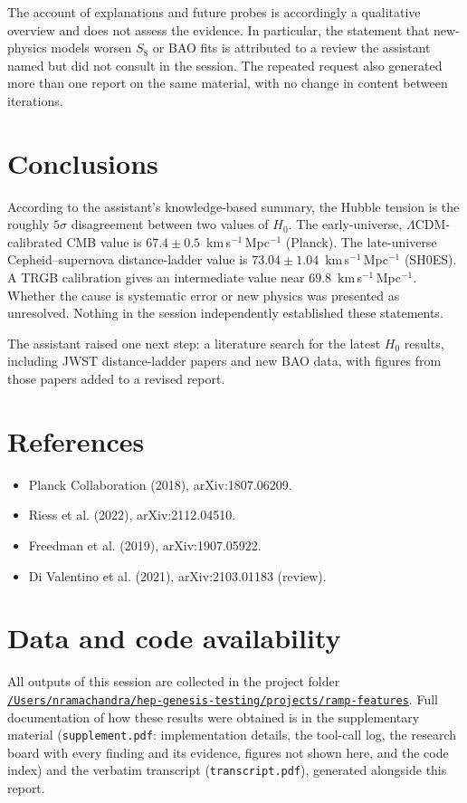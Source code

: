 \documentclass[11pt,a4paper]{article}
\begin{document}
The account of explanations and future probes is accordingly a qualitative overview and does not assess the evidence. In particular, the statement that new-physics models worsen $S_8$ or BAO fits is attributed to a review the assistant named but did not consult in the session. The repeated request also generated more than one report on the same material, with no change in content between iterations.

\section{Conclusions}
According to the assistant's knowledge-based summary, the Hubble tension is the roughly $5\sigma$ disagreement between two values of $H_0$. The early-universe, $\Lambda$CDM-calibrated CMB value is $67.4 \pm 0.5$~km\,s$^{-1}$\,Mpc$^{-1}$ (Planck). The late-universe Cepheid--supernova distance-ladder value is $73.04 \pm 1.04$~km\,s$^{-1}$\,Mpc$^{-1}$ (SH0ES). A TRGB calibration gives an intermediate value near $69.8$~km\,s$^{-1}$\,Mpc$^{-1}$. Whether the cause is systematic error or new physics was presented as unresolved. Nothing in the session independently established these statements.

The assistant raised one next step: a literature search for the latest $H_0$ results, including JWST distance-ladder papers and new BAO data, with figures from those papers added to a revised report.

\section*{References}
\begin{itemize}
\item Planck Collaboration (2018), arXiv:1807.06209.
\item Riess et al. (2022), arXiv:2112.04510.
\item Freedman et al. (2019), arXiv:1907.05922.
\item Di Valentino et al. (2021), arXiv:2103.01183 (review).
\end{itemize}

\section*{Data and code availability}
All outputs of this session are collected in the project folder \href{file:///Users/nramachandra/hep-genesis-testing/projects/ramp-features}{\texttt{/\allowbreak{}Users/\allowbreak{}nramachandra/\allowbreak{}hep-genesis-testing/\allowbreak{}projects/\allowbreak{}ramp-features}}.
Full documentation of how these results were obtained is in the supplementary material (\texttt{supplement.pdf}: implementation details, the tool-call log, the research board with every finding and its evidence, figures not shown here, and the code index) and the verbatim transcript (\texttt{transcript.pdf}), generated alongside this report.
\end{document}
